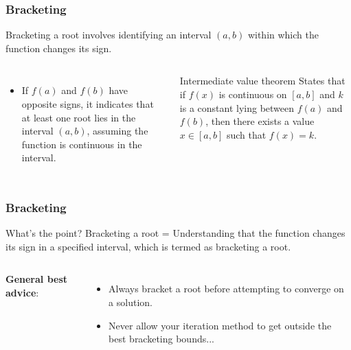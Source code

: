 {\nologo
\begin{frame}[fragile]
  \frametitle{Bracketing}

  Bracketing a root involves identifying an interval \((a, b)\) within which the function changes its sign.
  \begin{columns}
    \vspace{0.25cm}
    
    \vspace{0.25cm}
    
    \begin{itemize}
      \item If \(f(a)\) and \(f(b)\) have opposite signs, it indicates that at least one root lies in the interval \((a, b)\), assuming the function is continuous in the interval.
    \end{itemize}
    \begin{block}{Intermediate value theorem}
      States that if \(f(x)\) is continuous on \([a, b]\) and \(k\) is a constant lying between \(f(a)\) and \(f(b)\), then there exists a value \(x \in [a, b]\) such that \(f(x) = k\).
    \end{block}
  \end{columns}
\end{frame}
}

\begin{frame}[fragile]
  \frametitle{Bracketing}

  \begin{block}{What's the point?}
    Bracketing a root = Understanding that the function changes its sign in a specified interval, which is termed as bracketing a root.
  \end{block}
  \vspace*{1cm}
  \begin{columns}
    \vspace{0.25cm}
    

    \textbf{General best advice}:
    \begin{itemize}
      \item Always bracket a root before attempting to converge on a solution.
      \item Never allow your iteration method to get outside the best bracketing bounds...
    \end{itemize}
  \end{columns}
\end{frame}

